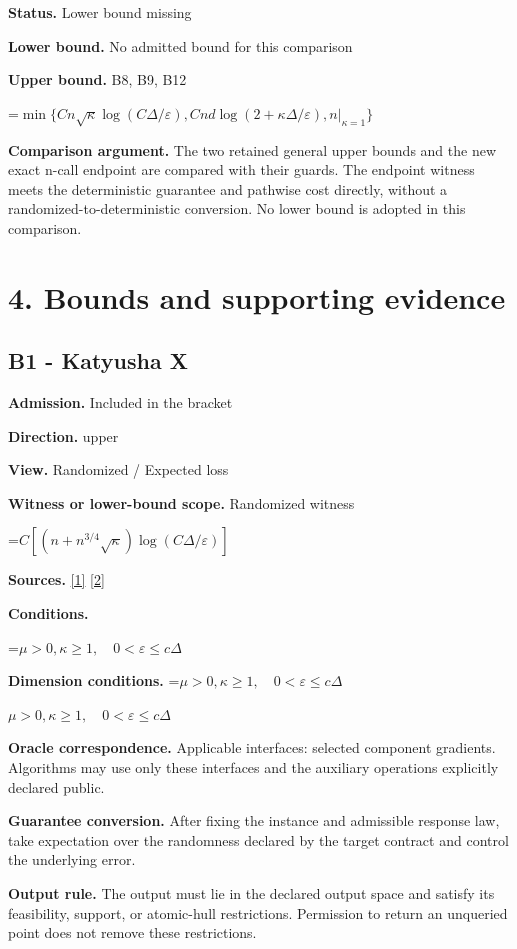 \documentclass[10pt,a4paper]{article}
\newcommand{\AtlasMath}[1]{\par\begingroup\centering\setbox0=\hbox{$\displaystyle #1$}\ifdim\wd0>1.4\linewidth\typeout{ATLAS WIDE FORMULA: \the\wd0}\fi\ifdim\wd0>\linewidth\resizebox{\linewidth}{!}{\box0}\else\box0\fi\par\endgroup}
\newcommand{\AtlasInlineMath}[1]{\begingroup\setbox0=\hbox{$#1$}\ifdim\wd0>.4\linewidth\endgroup\AtlasMath{#1}\else\endgroup$#1$\fi}
\begin{document}
\textbf{Status.} Lower bound missing

\textbf{Lower bound.} No admitted bound for this comparison

\textbf{Upper bound.} B8, B9, B12

\AtlasMath{\min\{Cn\sqrt\kappa\log(C\Delta/\varepsilon),Cnd\log(2+\kappa\Delta/\varepsilon),\left.n\right|_{\kappa=1}\}}
\textbf{Comparison argument.} The two retained general upper bounds and the new exact n-call endpoint are compared with their guards. The endpoint witness meets the deterministic guarantee and pathwise cost directly, without a randomized-to-deterministic conversion. No lower bound is adopted in this comparison.

\section{4. Bounds and supporting evidence}
\subsection{B1 - Katyusha X}
\textbf{Admission.} Included in the bracket

\textbf{Direction.} upper

\textbf{View.} Randomized / Expected loss

\textbf{Witness or lower-bound scope.} Randomized witness

\AtlasMath{C[(n+n^{3/4}\sqrt\kappa)\log(C\Delta/\varepsilon)]}
\textbf{Sources.} \href{https://arxiv.org/pdf/1802.03866}{[1]} \href{https://proceedings.mlr.press/v97/zhou19b/zhou19b.pdf}{[2]}

\textbf{Conditions.} 
\AtlasMath{\mu>0,\kappa\ge1,\quad0<\varepsilon\le c\Delta}


\textbf{Dimension conditions.} \AtlasInlineMath{\mu>0,\kappa\ge1,\quad0<\varepsilon\le c\Delta}

\textbf{Oracle correspondence.} Applicable interfaces: selected component gradients. Algorithms may use only these interfaces and the auxiliary operations explicitly declared public.

\textbf{Guarantee conversion.} After fixing the instance and admissible response law, take expectation over the randomness declared by the target contract and control the underlying error.

\textbf{Output rule.} The output must lie in the declared output space and satisfy its feasibility, support, or atomic-hull restrictions. Permission to return an unqueried point does not remove these restrictions.
\end{document}

